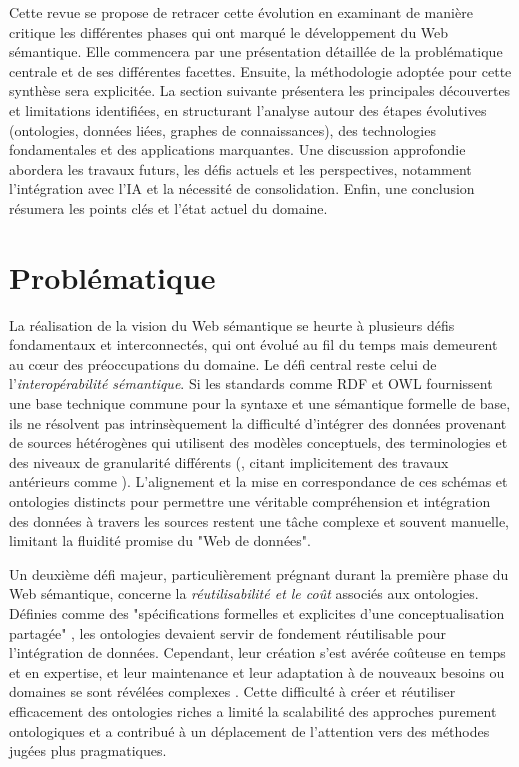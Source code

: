 \documentclass[9pt,twocolumn,twoside,french]{opticajnl}
\begin{document}
Cette revue se propose de retracer cette évolution en examinant de manière critique les différentes phases qui ont marqué le développement du Web sémantique. Elle commencera par une présentation détaillée de la problématique centrale et de ses différentes facettes. Ensuite, la méthodologie adoptée pour cette synthèse sera explicitée. La section suivante présentera les principales découvertes et limitations identifiées, en structurant l'analyse autour des étapes évolutives (ontologies, données liées, graphes de connaissances), des technologies fondamentales et des applications marquantes. Une discussion approfondie abordera les travaux futurs, les défis actuels et les perspectives, notamment l'intégration avec l'IA et la nécessité de consolidation. Enfin, une conclusion résumera les points clés et l'état actuel du domaine.

\section{Problématique}
La réalisation de la vision du Web sémantique se heurte à plusieurs défis fondamentaux et interconnectés, qui ont évolué au fil du temps mais demeurent au cœur des préoccupations du domaine. Le défi central reste celui de l'\textit{interopérabilité sémantique}. Si les standards comme RDF et OWL fournissent une base technique commune pour la syntaxe et une sémantique formelle de base, ils ne résolvent pas intrinsèquement la difficulté d'intégrer des données provenant de sources hétérogènes qui utilisent des modèles conceptuels, des terminologies et des niveaux de granularité différents (\citealp{Hitzler2021}, citant implicitement des travaux antérieurs comme \citealp{Hitzler2010Foundations}). L'alignement et la mise en correspondance de ces schémas et ontologies distincts pour permettre une véritable compréhension et intégration des données à travers les sources restent une tâche complexe et souvent manuelle, limitant la fluidité promise du "Web de données".

Un deuxième défi majeur, particulièrement prégnant durant la première phase du Web sémantique, concerne la \textit{réutilisabilité et le coût} associés aux ontologies. Définies comme des "spécifications formelles et explicites d'une conceptualisation partagée" \citep{Gruber1993A}, les ontologies devaient servir de fondement réutilisable pour l'intégration de données. Cependant, leur création s'est avérée coûteuse en temps et en expertise, et leur maintenance et leur adaptation à de nouveaux besoins ou domaines se sont révélées complexes \citep{Hitzler2021}. Cette difficulté à créer et réutiliser efficacement des ontologies riches a limité la scalabilité des approches purement ontologiques et a contribué à un déplacement de l'attention vers des méthodes jugées plus pragmatiques.
\end{document}
